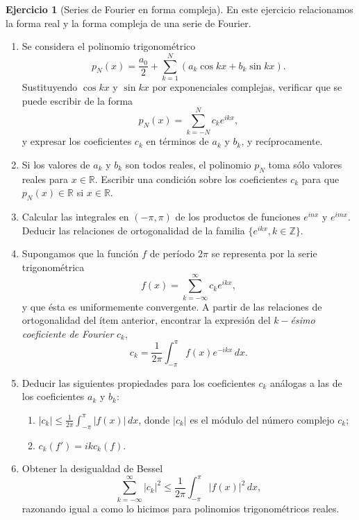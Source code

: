 \documentclass[12pt, a4paper]{amsbook}
\newcommand{\R}{{\mathbb R}}
\newcommand{\Z}{{\mathbb Z}}
\theoremstyle{remark}
\theoremstyle{definition}
\newtheorem{ejer}[teo]{Ejercicio}
\numberwithin{section}{chapter}
\numberwithin{subsection}{section}
\numberwithin{equation}{section}
\numberwithin{figure}{chapter}
\begin{document}
 \begin{ejer}[Series de Fourier en forma compleja]
En este ejercicio relacionamos la forma real y la forma compleja de una serie de Fourier.

\begin{enumerate}
 \item Se considera el polinomio trigonométrico
 $$
 p_N(x)= \frac{a_0}{2} + \sum_{k=1}^N (a_k \cos kx + b_k \sin kx).
 $$
 Sustituyendo $\cos kx$ y $\sin kx$ por exponenciales complejas, verificar que se puede escribir de la forma
 $$
 p_N(x) = \sum_{k=-N}^N c_k e^{ikx},
 $$
 y expresar los coeficientes $c_k$ en términos de $a_k$ y $b_k$, y recíprocamente.
 
 \item Si los valores de $a_k$ y $b_k$ son todos reales, el polinomio $p_N$ toma sólo valores reales para $x\in\R$. Escribir una condición sobre los coeficientes $c_k$ para que $p_N(x)\in \R$ si $x\in\R$.

\item Calcular las integrales en $(-\pi,\pi)$ de los productos de funciones $e^{inx}$ y $e^{imx}$. Deducir las relaciones de ortogonalidad de la familia $\{e^{ikx}, k\in\Z\}$.

\item Supongamos que la función $f$ de período $2\pi$ se representa por la serie trigonométrica
 $$
 f(x) = \sum_{k=-\infty}^\infty c_k e^{ikx},
 $$
y que ésta es uniformemente convergente. A partir de las relaciones de ortogonalidad del ítem anterior, encontrar la expresión del {\em $k-$ésimo coeficiente de Fourier} $c_k$,
$$
c_k = \frac{1}{2\pi} \int_{-\pi}^\pi f(x)e^{-ikx}\, dx.
$$

\item Deducir las siguientes propiedades para los coeficientes $c_k$ análogas a las de los coeficientes $a_k$ y $b_k$:
\begin{enumerate}
\item $|c_k|\le \frac{1}{2\pi} \int_{-\pi}^\pi |f(x)|\, dx$, donde $|c_k|$ es el módulo del número complejo $c_k$;
\item $c_k(f')=ik c_k(f)$.
\end{enumerate}

\item Obtener la desigualdad de Bessel
$$
\sum_{k=-\infty}^\infty |c_k|^2 \le \frac{1}{2\pi} \int_{-\pi}^\pi |f(x)|^2\, dx,
$$
razonando igual a como lo hicimos para polinomios trigonométricos reales.
\end{enumerate}
\end{ejer}
\end{document}
